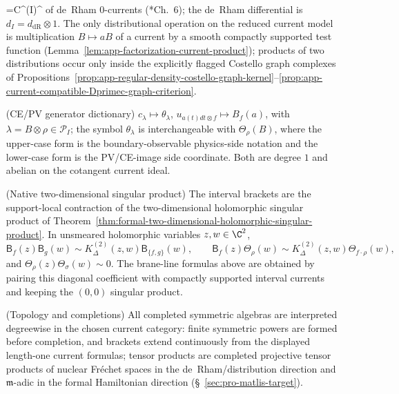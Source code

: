 \begin{itemize}
       =C^\infty(I)^\vee\) of de~Rham \(0\)-currents
    (\cite{hormander-vol1}*{Ch.~6}); the de~Rham differential is
    \(d_I=d_{\mathrm{dR}}\otimes 1\).  The only distributional
    operation on the reduced current model is multiplication
    \(B\mapsto aB\) of a current by a smooth compactly supported test
    function (Lemma~\ref{lem:app-factorization-current-product}); products
    of two distributions occur only inside the explicitly flagged
    Costello graph complexes of
    Propositions~\ref{prop:app-regular-density-costello-graph-kernel}--\ref{prop:app-current-compatible-Dprimec-graph-criterion}.
  \item[(CE/PV generator dictionary)]
    \(c_\lambda\longmapsto\theta_\lambda\), \(u_{a(t)dt\otimes f}\longmapsto B_f(a)\), with
    \(\lambda=B\otimes\rho\in\mathcal P_I\); the symbol
    \(\theta_\lambda\) is interchangeable with \(\Theta_\rho(B)\),
    where the upper-case form is the boundary-observable physics-side
    notation and the lower-case form is the PV/CE-image side
    coordinate.  Both are degree \(1\) and abelian on the cotangent
    current ideal.
  \item[(Native two-dimensional singular product)]
    The interval brackets are the support-local contraction of the
    two-dimensional holomorphic singular product of
    Theorem~\ref{thm:formal-two-dimensional-holomorphic-singular-product}.  In
    unsmeared holomorphic variables \(z,w\in\C^2\),
    \[
      \mathsf{B}_f(z)\mathsf{B}_g(w)
      \sim K^{(2)}_\Delta(z,w)\mathsf{B}_{\{f,g\}}(w),\qquad
      \mathsf{B}_f(z)\mathsf{\Theta}_\rho(w)
      \sim K^{(2)}_\Delta(z,w)\mathsf{\Theta}_{f\cdot\rho}(w),
    \]
    and \(\mathsf{\Theta}_\rho(z)\mathsf{\Theta}_\sigma(w)\sim0\).
    The brane-line formulas above are obtained by pairing this diagonal
    coefficient with compactly supported interval currents and keeping
    the \((0,0)\) singular product.
  \item[(Topology and completions)]
    All completed symmetric algebras are interpreted degreewise in the
    chosen current category: finite symmetric powers are formed
    before completion, and brackets extend continuously from the
    displayed length-one current formulas; tensor products are
    completed projective tensor products of nuclear Fr\'echet spaces in
    the de~Rham/distribution direction and \(\mathfrak m\)-adic in the
    formal Hamiltonian direction (\S~\ref{sec:pro-matlis-target}).
\end{itemize}

